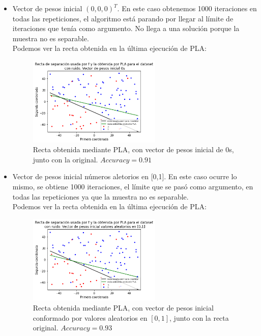 \documentclass[11pt,a4paper]{article}
\theoremstyle{definition}
\begin{document}
		\begin{itemize}
			\item Vector de pesos inicial $(0,0,0)^T$. En este caso obtenemos 1000 iteraciones en todas las repeticiones, el algoritmo está parando por llegar al límite de iteraciones que tenía como argumento. No llega a una solución porque la muestra no es separable.\\ Podemos ver la recta obtenida en la última ejecución de PLA:
			\begin{figure}[H]
			\centering
			\includegraphics[width=0.6\textwidth]{images/pla_ruido_0s}
			\caption{Recta obtenida mediante PLA, con vector de pesos inicial de 0s, junto con la original. $Accuracy=0.91$}
			\end{figure}
			\item Vector de pesos inicial números aletorios en [0,1]. En este caso ocurre lo mismo, se obtiene 1000 iteraciones, el límite que se pasó como argumento, en todas las repeticiones ya que la muestra no es separable.\\ Podemos ver la recta obtenida en la última ejecución de PLA:
			\begin{figure}[H]
			\centering
			\includegraphics[width=0.6\textwidth]{images/pla_ruido_random_vals}
			\caption{Recta obtenida mediante PLA, con vector de pesos inicial conformado por valores aleatorios en $[0,1]$, junto con la recta original. $Accuracy=0.93$}
			\end{figure}
		\end{itemize}
\end{document}

